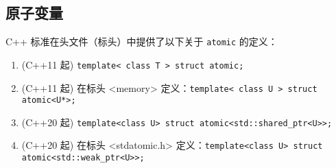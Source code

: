 \subsection{原子变量}
C++ 标准在头文件（标头）中提供了以下关于 \verb`atomic` 的定义：
\begin{enumerate}
\item (C++11 起) \verb`template< class T > struct atomic;`
\item (C++11 起) 在标头 <memory> 定义：\verb`template< class U > struct atomic<U*>;`
\item (C++20 起) \verb`template<class U> struct atomic<std::shared_ptr<U>>;`
\item (C++20 起) 在标头 <stdatomic.h> 定义：\verb`template<class U> struct atomic<std::weak_ptr<U>>;`
\end{enumerate}


